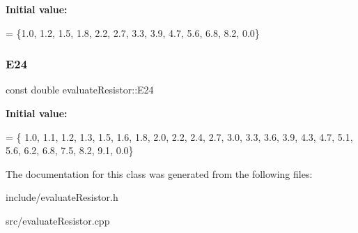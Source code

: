 {\bfseries Initial value\+:}
\begin{DoxyCode}
= \{1.0, 1.2, 1.5, 1.8, 2.2, 2.7, 3.3,
                                        3.9, 4.7, 5.6, 6.8, 8.2, 0.0\}
\end{DoxyCode}
\mbox{\label{classevaluateResistor_a05152df560338e850ff81a930267b246}} 
\subsubsection{\texorpdfstring{E24}{E24}}
{\footnotesize\ttfamily const double evaluate\+Resistor\+::\+E24\hspace{0.3cm}{\ttfamily [static]}}

{\bfseries Initial value\+:}
\begin{DoxyCode}
= \{
    1.0, 1.1, 1.2, 1.3, 1.5, 1.6, 1.8, 2.0, 2.2, 2.4, 2.7, 3.0, 3.3,
    3.6, 3.9, 4.3, 4.7, 5.1, 5.6, 6.2, 6.8, 7.5, 8.2, 9.1, 0.0\}
\end{DoxyCode}


The documentation for this class was generated from the following files\+:\begin{DoxyCompactItemize}
\item 
include/evaluate\+Resistor.\+h\item 
src/evaluate\+Resistor.\+cpp\end{DoxyCompactItemize}
